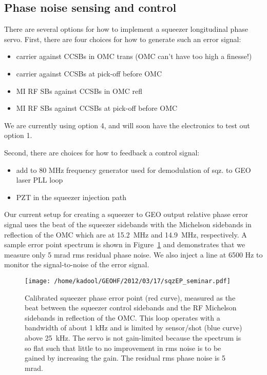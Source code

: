 \documentclass{ligodoc}
\begin{document}
\subsection{Phase noise sensing and control}
There are several options for how to implement a squeezer longitudinal
phase servo. First, there are four choices for how to generate such
an error signal:
\begin{itemize}
\item carrier against CCSBs in OMC trans (OMC can't have too high a finesse!)
\item carrier against CCSBs at pick-off before OMC
\item MI RF SBs against CCSBs in OMC refl
\item MI RF SBs against CCSBs at pick-off before OMC
\end{itemize}
We are currently using option 4, and will soon have the electronics to
test out option 1.

Second, there are choices for how to feedback a control signal:
\begin{itemize}
\item add to 80 MHz frequency generator used for demodulation of
  sqz. to GEO laser PLL loop
\item PZT in the squeezer injection path
\end{itemize}


Our current setup for creating a squeezer to GEO output relative phase
error signal uses the beat of the squeezer sidebands with the
Michelson sidebands in reflection of the OMC which are at 15.2~MHz and
14.9~MHz, respectively. A sample error point spectrum is shown in
Figure~\ref{fig:sqzEP} and demonstrates that we measure only 5 mrad
rms residual phase noise. We also inject a line at 6500 Hz to monitor
the signal-to-noise of the error signal.

\begin{figure}
\begin{centering}
\texttt{[image: /home/kadool/GEOHF/2012/03/17/sqzEP\_seminar.pdf]}
\caption{Calibrated squeezer phase error point (red curve), measured
  as the beat between the squeezer control sidebands and the RF
  Michelson sidebands in reflection of the OMC. This loop operates
  with a bandwidth of about 1 kHz and is limited by sensor/shot (blue
  curve) above 25~kHz. The servo is not gain-limited because the
  spectrum is so flat such that little to no improvement in rms
  noise is to be gained by increasing the gain. The residual rms phase
  noise is 5 mrad.}
\label{fig:sqzEP}
\end{centering}
\end{figure}
\end{document}
